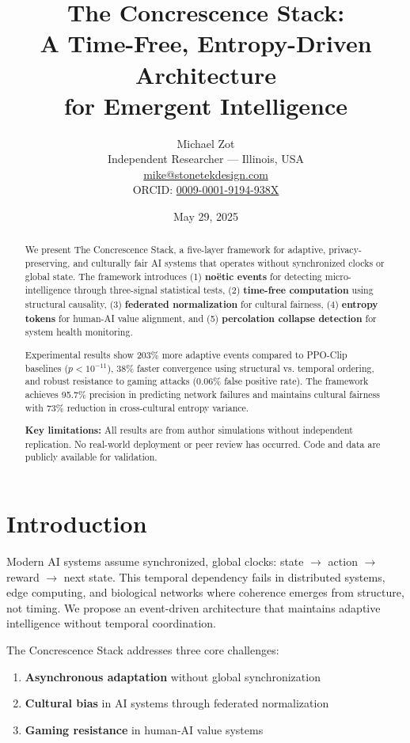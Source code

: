 \documentclass[11pt]{article}
\title{\Huge The Concrescence Stack:\\
A Time-Free, Entropy-Driven Architecture\\
for Emergent Intelligence}
\author{\large Michael Zot\\
Independent Researcher --- Illinois, USA\\
\href{mailto:mike@stonetekdesign.com}{mike@stonetekdesign.com}\\
ORCID: \href{https://orcid.org/0009-0001-9194-938X}{0009-0001-9194-938X}}
\date{May 29, 2025}
\begin{document}
\maketitle

\begin{abstract}
We present The Concrescence Stack, a five-layer framework for adaptive, privacy-preserving, and culturally fair AI systems that operates without synchronized clocks or global state. The framework introduces (1) \textbf{noëtic events} for detecting micro-intelligence through three-signal statistical tests, (2) \textbf{time-free computation} using structural causality, (3) \textbf{federated normalization} for cultural fairness, (4) \textbf{entropy tokens} for human-AI value alignment, and (5) \textbf{percolation collapse detection} for system health monitoring.

Experimental results show 203\% more adaptive events compared to PPO-Clip baselines ($p < 10^{-11}$), 38\% faster convergence using structural vs. temporal ordering, and robust resistance to gaming attacks (0.06\% false positive rate). The framework achieves 95.7\% precision in predicting network failures and maintains cultural fairness with 73\% reduction in cross-cultural entropy variance.

\textbf{Key limitations:} All results are from author simulations without independent replication. No real-world deployment or peer review has occurred. Code and data are publicly available for validation.
\end{abstract}

\section{Introduction}
Modern AI systems assume synchronized, global clocks: state $\rightarrow$ action $\rightarrow$ reward $\rightarrow$ next state. This temporal dependency fails in distributed systems, edge computing, and biological networks where coherence emerges from structure, not timing. We propose an event-driven architecture that maintains adaptive intelligence without temporal coordination.

The Concrescence Stack addresses three core challenges:
\begin{enumerate}
    \item \textbf{Asynchronous adaptation} without global synchronization
    \item \textbf{Cultural bias} in AI systems through federated normalization
    \item \textbf{Gaming resistance} in human-AI value systems
\end{enumerate}
\end{document}
